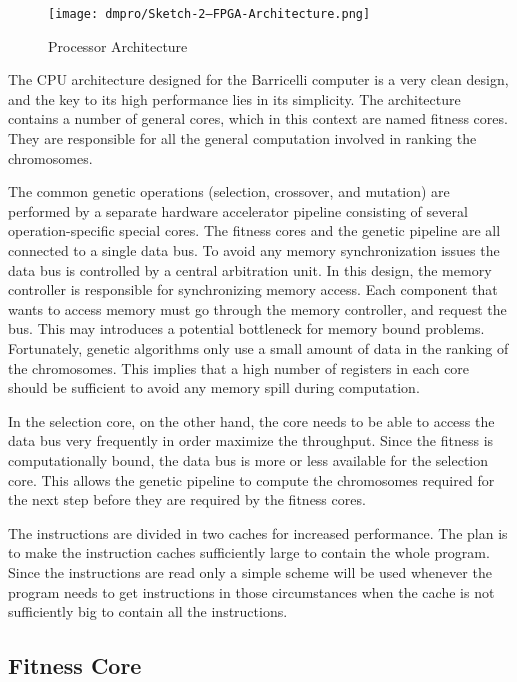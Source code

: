 \begin{figure}[H]
\texttt{[image: dmpro/Sketch-2---FPGA-Architecture.png]}
\caption{Processor Architecture}
\label{figure:fpga-architecture}
\end{figure}

The CPU architecture designed for the Barricelli computer is a very clean design, and the key to its high performance lies in its simplicity.
The architecture contains a number of general cores, which in this context are named fitness cores.
They are responsible for all the general computation involved in ranking the chromosomes.

The common genetic operations (selection, crossover, and mutation) are performed by a separate hardware accelerator pipeline consisting of several operation-specific special cores.
The fitness cores and the genetic pipeline are all connected to a single data bus.
To avoid any memory synchronization issues the data bus is controlled by a central arbitration unit.
In this design, the memory controller is responsible for synchronizing memory access.
Each component that wants to access memory must go through the memory controller, and request the bus.
This may introduces a potential bottleneck for memory bound problems.
Fortunately, genetic algorithms only use a small amount of data in the ranking of the chromosomes.
This implies that a high number of registers in each core should be sufficient to avoid any memory spill during computation.

In the selection core, on the other hand, the core needs to be able to access the data bus very frequently in order maximize the throughput.
Since the fitness is computationally bound, the data bus is more or less available for the selection core.
This allows the genetic pipeline to compute the chromosomes required for the next step before they are required by the fitness cores. 


The instructions are divided in two caches for increased performance.
The plan is to make the instruction caches sufficiently large to contain the whole program.
Since the instructions are read only a simple scheme will be used whenever the program needs to get instructions in those circumstances when the cache is not sufficiently big to contain all the instructions. 


\subsection{Fitness Core} \label{fpga:fitness:ss:design_of_the_fitness_core}
     \label{fpga:subsection:fitness_core}


